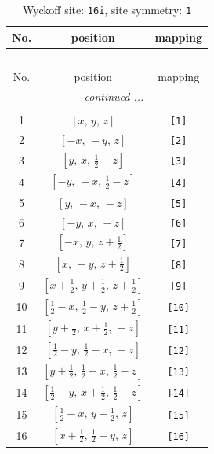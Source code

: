 \documentclass[fleqn,8pt]{jsarticle}
\begin{document}
\begin{longtable}{ccc}
\caption{Wyckoff site: {\tt 16i}, site symmetry: {\tt 1}}
 \\
 \hline \hline
No. & position & mapping \\ \hline \endfirsthead

\multicolumn{2}{l}{\tablename\ \thetable{}} \\
 \hline \hline
No. & position & mapping \\ \hline \endhead

 \hline \hline
\multicolumn{2}{r}{\footnotesize\it continued ...} \\ \endfoot

 \hline \hline
\multicolumn{2}{r}{} \\ \endlastfoot

1 & $\left[ x,\, y,\, z \right]$ & {\tt [1]} \\ \hline
2 & $\left[ - x,\, - y,\, z \right]$ & {\tt [2]} \\ \hline
3 & $\left[ y,\, x,\, \frac{1}{2} - z \right]$ & {\tt [3]} \\ \hline
4 & $\left[ - y,\, - x,\, \frac{1}{2} - z \right]$ & {\tt [4]} \\ \hline
5 & $\left[ y,\, - x,\, - z \right]$ & {\tt [5]} \\ \hline
6 & $\left[ - y,\, x,\, - z \right]$ & {\tt [6]} \\ \hline
7 & $\left[ - x,\, y,\, z + \frac{1}{2} \right]$ & {\tt [7]} \\ \hline
8 & $\left[ x,\, - y,\, z + \frac{1}{2} \right]$ & {\tt [8]} \\ \hline
9 & $\left[ x + \frac{1}{2},\, y + \frac{1}{2},\, z + \frac{1}{2} \right]$ & {\tt [9]} \\ \hline
10 & $\left[ \frac{1}{2} - x,\, \frac{1}{2} - y,\, z + \frac{1}{2} \right]$ & {\tt [10]} \\ \hline
11 & $\left[ y + \frac{1}{2},\, x + \frac{1}{2},\, - z \right]$ & {\tt [11]} \\ \hline
12 & $\left[ \frac{1}{2} - y,\, \frac{1}{2} - x,\, - z \right]$ & {\tt [12]} \\ \hline
13 & $\left[ y + \frac{1}{2},\, \frac{1}{2} - x,\, \frac{1}{2} - z \right]$ & {\tt [13]} \\ \hline
14 & $\left[ \frac{1}{2} - y,\, x + \frac{1}{2},\, \frac{1}{2} - z \right]$ & {\tt [14]} \\ \hline
15 & $\left[ \frac{1}{2} - x,\, y + \frac{1}{2},\, z \right]$ & {\tt [15]} \\ \hline
16 & $\left[ x + \frac{1}{2},\, \frac{1}{2} - y,\, z \right]$ & {\tt [16]} \\
\end{longtable}
\end{document}
